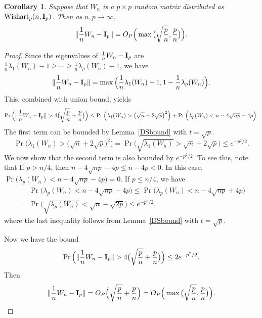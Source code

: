 \documentclass[review]{elsarticle}
\theoremstyle{plain}
\newtheorem{corollary}{\quad\quad Corollary}
\theoremstyle{definition}
\theoremstyle{remark}
\begin{document}
{\color{red}
\begin{corollary}\label{corNorm}
Suppose that $W_n$ is a $p \times p$ random matrix distributed as $\mathrm{Wishart}_p(n,\mathbf{I}_{p})$. Then as $n,p\to \infty$,
$$
    \|\frac{1}{n}W_n-\mathbf{I}_p\|=O_P\Big(\max\big(\sqrt{\frac{p}{n}},\frac{p}{n}\big)\Big).
$$
\end{corollary}
\begin{proof}
    Since the eigenvalues of $\frac{1}{n}W_n-\mathbf{I}_p$ are $\frac{1}{n}\lambda_1(W_n)-1\geq\cdots\geq\frac{1}{n}\lambda_p(W_n)-1$, we have
     $$\|\frac{1}{n}W_n-\mathbf{I}_p\|=\max\Big(\frac{1}{n}\lambda_1(W_n)-1,1-\frac{1}{n}\lambda_p(W_n)\Big).$$
This, combined with union bound, yields
$$
    \Pr\Big(\|\frac{1}{n}W_n-\BI_p\|>4\big(\sqrt{\frac{p}{n}}+\frac{p}{n}\big)\Big)
    \leq
    \Pr\Big(\lambda_1(W_n)>\big(\sqrt{n}+2\sqrt{p}\big)^2\Big)+
    \Pr\Big(\lambda_p(W_n)<n-4\sqrt{np}-4p\Big).
$$
    The first term can be bounded by Lemma~\ref{DSbound} with $t=\sqrt{p}$.
    $$
    \Pr\Big(\lambda_1(W_n)>\big(\sqrt{n}+2\sqrt{p}\big)^2\Big)=
    \Pr\Big(\sqrt{\lambda_1(W_n)}>\sqrt{n}+2\sqrt{p}\Big)\leq e^{-p^2/2}.
    $$
    We now show that the second term is also bounded by $e^{-p^2/2}$.
    To see this, note that
    If $p>n/4$, then $n-4\sqrt{np}-4p\leq n-4p<0$. In this case, $\Pr\Big(\lambda_p(W_n)<n-4\sqrt{np}-4p\Big)=0$.
    If $p\leq n/4$, we have
    $$
    \begin{aligned}
        &\Pr\Big(\lambda_p(W_n)<n-4\sqrt{np}-4p\Big)
    \leq
    \Pr\Big(\lambda_p(W_n)<n-4\sqrt{np}+4p\Big)\\
        =&
    \Pr\Big(\sqrt{\lambda_p(W_n)}<\sqrt{n}-\sqrt{2p}\Big)
        \leq e^{-p^2/2},
    \end{aligned}
    $$
    where the last inequality follows from Lemma~\ref{DSbound} with $t=\sqrt{p}$.

    Now we have the bound
    $$
    \Pr\Big(\|\frac{1}{n}W_n-\BI_p\|>4\big(\sqrt{\frac{p}{n}}+\frac{p}{n}\big)\Big)
    \leq 2 e^{-p^2/2}.
    $$
    Then 
    $$\|\frac{1}{n}W_n-\mathbf{I}_p\|=O_P\Big(\sqrt{\frac{p}{n}}+\frac{p}{n}\Big)=O_P\Big(\max\big(\sqrt{\frac{p}{n}},\frac{p}{n}\big)\Big).$$
\end{proof}
}
\end{document}
